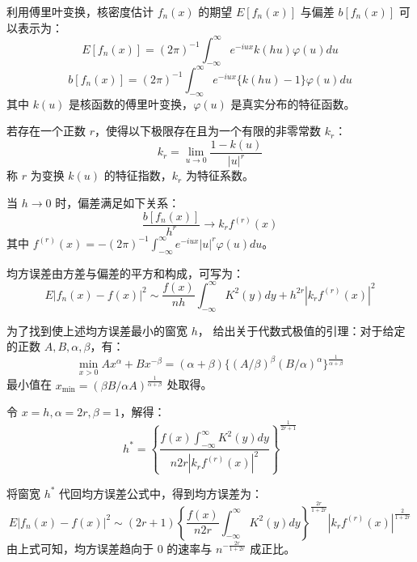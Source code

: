 \documentclass[UTF8]{ctexart}
\begin{document}
利用傅里叶变换，核密度估计 $f_n(x)$ 的期望 $E[f_n(x)]$ 与偏差 $b[f_n(x)]$ 可以表示为：
\begin{equation}
E[f_n(x)] = (2\pi)^{-1} \int_{-\infty}^{\infty} e^{-iux} k(hu) \varphi(u) du
\end{equation}
\begin{equation}
b[f_n(x)] = (2\pi)^{-1} \int_{-\infty}^{\infty} e^{-iux} \{k(hu) - 1\} \varphi(u) du
\end{equation}
其中 $k(u)$ 是核函数的傅里叶变换，$\varphi(u)$ 是真实分布的特征函数。

若存在一个正数 $r$，使得以下极限存在且为一个有限的非零常数 $k_r$：
\begin{equation}
k_r = \lim_{u \rightarrow 0} \frac{1 - k(u)}{|u|^r}
\end{equation}
称 $r$ 为变换 $k(u)$ 的特征指数，$k_r$ 为特征系数。

当 $h \rightarrow 0$ 时，偏差满足如下关系：
\begin{equation}
\frac{b[f_n(x)]}{h^r} \rightarrow k_r f^{(r)}(x)
\end{equation}
其中 $f^{(r)}(x) = -(2\pi)^{-1} \int_{-\infty}^{\infty} e^{-iux} |u|^r \varphi(u) du$。


均方误差由方差与偏差的平方和构成，可写为：
\begin{equation}
E|f_n(x) - f(x)|^2 \sim \frac{f(x)}{nh} \int_{-\infty}^{\infty} K^2(y) dy + h^{2r}|k_r f^{(r)}(x)|^2
\end{equation}

为了找到使上述均方误差最小的窗宽 $h$，
给出关于代数式极值的引理：对于给定的正数 $A, B, \alpha, \beta$，有：
\begin{equation}
\min_{x > 0} A x^\alpha + B x^{-\beta} = (\alpha + \beta) \{(A/\beta)^\beta (B/\alpha)^\alpha\}^{\frac{1}{\alpha + \beta}}
\end{equation}
最小值在 $x_{\min} = (\beta B / \alpha A)^{\frac{1}{\alpha + \beta}}$ 处取得。

令 $x = h, \alpha = 2r, \beta = 1$，解得：
\begin{equation*}
h^* = \left\{ \frac{f(x) \int_{-\infty}^{\infty} K^2(y) dy}{n 2r |k_r f^{(r)}(x)|^2} \right\}^{\frac{1}{2r+1}}
\end{equation*}

将窗宽 $h^*$ 代回均方误差公式中，得到均方误差为：
\begin{equation}
E|f_n(x) - f(x)|^2 \sim (2r + 1) \left\{ \frac{f(x)}{n 2r} \int_{-\infty}^{\infty} K^2(y) dy \right\}^{\frac{2r}{1+2r}} |k_r f^{(r)}(x)|^{\frac{2}{1+2r}}
\end{equation}
由上式可知，均方误差趋向于 $0$ 的速率与 $n^{-\frac{2r}{1+2r}}$ 成正比。
\end{document}
